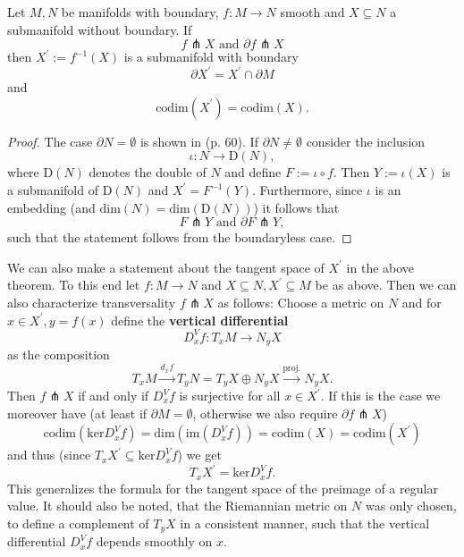     \begin{theorem}
    \label{thm:transversality}
    Let $M,N$ be manifolds with boundary, $f \colon M \to N$ smooth and $X \subseteq N$ a submanifold without boundary. If 
    \[
    f \pitchfork X \text{ and } \partial f \pitchfork X
    \]
    then $X^\prime := f^{-1}(X)$ is a submanifold with boundary 
    \[
    \partial X^\prime = X^\prime \cap \partial M
    \]
    and 
    \[
    \mathrm{codim}(X^\prime) = \mathrm{codim}(X).
    \]
    \end{theorem}
    \begin{proof}
        The case $\partial N = \emptyset$ is shown in \cite{guillemin2010differential} (p. 60). If $\partial N \neq \emptyset$ consider the inclusion
        \[
        \iota \colon N \to \mathrm{D}(N),
        \]
        where $\mathrm{D}(N)$ denotes the double of $N$ and define $F := \iota \circ f$. Then $Y := \iota(X)$ is a submanifold of $\mathrm{D}(N)$ and $X^\prime = F^{-1}(Y)$. Furthermore, since $\iota$ is an embedding (and $\mathrm{dim}(N) = \mathrm{dim}(\mathrm{D}(N))$) it follows that 
        \[
        F \pitchfork Y \text{ and } \partial F \pitchfork Y,
        \] 
        such that the statement follows from the boundaryless case.
    \end{proof}

       We can also make a statement about the tangent space of $X^\prime$ in the above theorem. To this end let $f \colon M \to N$ and $X \subseteq N, X^\prime \subseteq M$ be as above. Then we can also characterize transversality $f \pitchfork X$ as follows: Choose a metric on $N$ and for $x \in X^\prime, y = f(x)$ define the \textbf{vertical differential}
    \[
    D^V_xf \colon T_xM \to N_yX
    \]
    as the composition 
    \[
    T_xM \xrightarrow{d_xf} T_yN = T_yX \oplus N_yX \xrightarrow{\mathrm{proj.}} N_yX.
    \]
    Then $f \pitchfork X$ if and only if $D^V_xf$ is surjective for all $x \in X^\prime$. If this is the case we moreover have (at least if $\partial M = \emptyset$, otherwise we also require $\partial f \pitchfork X$)
    \[
    \mathrm{codim}(\mathrm{ker}D^V_xf) = \mathrm{dim}(\mathrm{im}(D^V_xf)) = \mathrm{codim}(X) = \mathrm{codim}(X^\prime)
    \]
    and thus (since $T_xX^\prime \subseteq \mathrm{ker}D^V_xf$) we get 
    \[
    T_xX^\prime = \mathrm{ker}D^V_xf.
    \]
    This generalizes the formula for the tangent space of the preimage of a regular value. It should also be noted, that the Riemannian metric on $N$ was only chosen, to define a complement of $T_yX$ in a consistent manner, such that the vertical differential $D^V_xf$ depends smoothly on $x$.

